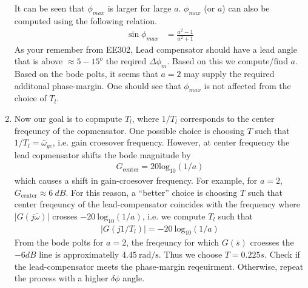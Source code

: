 \documentclass[twoside]{article}
\begin{document}
\begin{enumerate}
\begin{center}
\begin{minipage}[h]{\linewidth}
\begin{center}
     \end{center}
 \end{minipage}
     \end{center}
%
It can be seen that $\phi_{max}$ is larger for large $a$.
$\phi_{max}$ (or $a$) can also be computed using the following
relation.
%
\begin{align*}
\sin \phi_{max} &=  \frac{a^2 - 1}{a^2 + 1}
\end{align*}
%
As your remember from EE302, Lead compensator should 
have a lead angle that is above $\approx 5-15^o$ the reqired
$\Delta \phi_m$. Based on this we compute/find $a$. 
Based on the bode polts, it seems that $a =2$
may supply the required additonal phase-margin.
One should see that $\phi_{max}$ is not affected
from the choice of $T_{l}$. 
%
\item Now our goal is to copmpute $T_{l}$, where $1/T_{l}$
corresponds to the center freqeuncy of the copmensator.
One possible choice is choosing $T$ such that 
$1/T_{l} = \bar{\omega}_{gc}$, i.e. gain croesover frequency.
However, at center frequency the lead copmensator
shifts the bode magnitude by
%
\begin{align*}
G_{\mathrm{center}} = 20 \mathrm{log}_{10} (1 / a)
\end{align*}
%
which causes a shift in gain-croesover frequency. 
For example, for $a = 2$, $G_{\mathrm{center}} \approx 6 \ dB$. 
For this reason, a ``better'' choice is choosing $T$ such that
center freqeuncy of the lead-compensator coincides with
the frequency where $|G(j \bar{\omega})|$ crosses 
$- 20 \ \mathrm{log}_{10} (1 / a)$, i.e. we compute $T_{l}$
such that
%
\begin{align*}
  |G(j 1/T_{l})| = - 20 \ \mathrm{log}_{10} (1 / a)
\end{align*}
%
From the bode polts for $a = 2$, the freqeuncy for which 
$G(\bar{s})$ croesses the $- 6 dB$ line is approximatelly 
$4.45 \ \mathrm{rad/s}$. Thus we choose $T = 0.225 s$.
Check if the lead-compensator meets the phase-margin
reqeuirment. Otherwise, repeat the process with a higher
$\delta \phi$ angle.


\end{enumerate}
\end{document}
